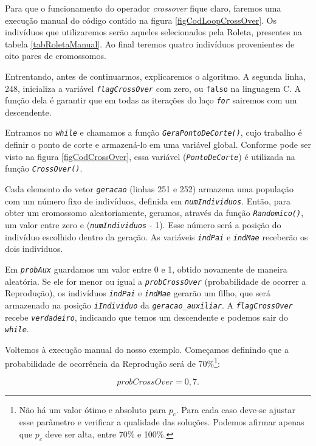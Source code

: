 	Para que o funcionamento do operador \textit{crossover} fique claro, faremos uma execução manual do código contido na figura \ref{figCodLoopCrossOver}. Os indivíduos que utilizaremos serão aqueles selecionados pela Roleta, presentes na tabela \ref{tabRoletaManual}. Ao final teremos quatro indivíduos provenientes de oito pares de cromossomos.
	
	Entrentando, antes de continuarmos, explicaremos o algoritmo.	A segunda linha, 248, inicializa a variável \textit{\texttt{flagCrossOver}} com zero, ou \texttt{falso} na linguagem C. A função dela é garantir que em todas as iterações do laço \textit{\texttt{for}} sairemos com um descendente.
	
	Entramos no \textit{\texttt{while}} e chamamos a função \textit{\texttt{GeraPontoDeCorte()}}, cujo trabalho é definir o ponto de corte e armazená-lo em uma variável global. Conforme pode ser visto na figura \ref{figCodCrossOver}, essa variável (\textit{\texttt{PontoDeCorte}}) é utilizada na função \textit{\texttt{CrossOver()}}.
	
	Cada elemento do vetor \textit{\texttt{geracao}} (linhas 251 e 252) armazena uma população com um número fixo de indivíduos, definida em \textit{\texttt{numIndividuos}}. Então, para obter um cromossomo aleatoriamente, geramos, através da função \textit{\texttt{Randomico()}}, um valor entre zero e (\textit{\texttt{numIndividuos}} - 1). Esse número será a posição do indivíduo escolhido dentro da geração. 	As variáveis \textit{\texttt{indPai}} e \textit{\texttt{indMae}} receberão os dois indivíduos. 
	
	Em \textit{\texttt{probAux}} guardamos um valor entre 0 e 1, obtido novamente de maneira aleatória. Se ele for menor ou igual a \textit{\texttt{probCrossOver}} (probabilidade de ocorrer a Reprodução), os indivíduos \textit{\texttt{indPai}} e \textit{\texttt{indMae}} gerarão um filho, que será armazenado na posição \textit{\texttt{iIndividuo}} da \textit{\texttt{geracao\_auxiliar}}. A \textit{\texttt{flagCrossOver}} recebe \textit{\texttt{verdadeiro}}, indicando que temos um descendente e podemos sair do \textit{\texttt{while}}.
	
	Voltemos à execução manual do nosso exemplo. Começamos definindo que a probabilidade de ocorrência da Reprodução será de 70\%\footnote{Não há um valor ótimo e absoluto para $p_c$. Para cada caso deve-se ajustar esse parâmetro e verificar a qualidade das soluções. Podemos afirmar apenas que $p_c$ deve ser alta, entre 70\% e 100\%.}:
	
	$$
		probCrossOver = 0,7.
	$$	
	

